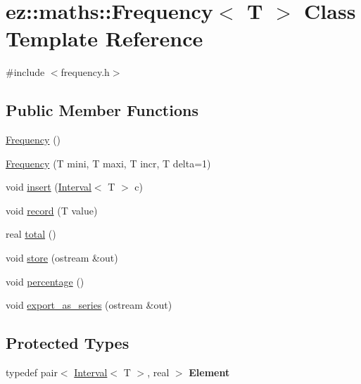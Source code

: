 \hypertarget{classez_1_1maths_1_1Frequency}{}\section{ez\+:\+:maths\+:\+:Frequency$<$ T $>$ Class Template Reference}
\label{classez_1_1maths_1_1Frequency}


{\ttfamily \#include $<$frequency.\+h$>$}

\subsection*{Public Member Functions}
\begin{DoxyCompactItemize}
\item 
\hyperlink{classez_1_1maths_1_1Frequency_aa090ee7e4117d4f5a694de71c44ec789}{Frequency} ()
\item 
\hyperlink{classez_1_1maths_1_1Frequency_a5fe6cf61394f7fc424c4d93392f734a2}{Frequency} (T mini, T maxi, T incr, T delta=1)
\item 
void \hyperlink{classez_1_1maths_1_1Frequency_a93882872b801cb8f47e61f32b24a051a}{insert} (\hyperlink{classez_1_1maths_1_1Interval}{Interval}$<$ T $>$ c)
\item 
void \hyperlink{classez_1_1maths_1_1Frequency_acd474d72e33becac99dc5dff9bcdb3e8}{record} (T value)
\item 
real \hyperlink{classez_1_1maths_1_1Frequency_aa18480ae307a14ad3a528476194d022e}{total} ()
\item 
void \hyperlink{classez_1_1maths_1_1Frequency_a102cd5f7b102ee433126fe809b2dfccb}{store} (ostream \&out)
\item 
void \hyperlink{classez_1_1maths_1_1Frequency_a4b1bc9f927a526e0ca1bbc59f1a14ca6}{percentage} ()
\item 
void \hyperlink{classez_1_1maths_1_1Frequency_af24be0f62175280c79ef1107f4a07b8d}{export\+\_\+as\+\_\+series} (ostream \&out)
\end{DoxyCompactItemize}
\subsection*{Protected Types}
\begin{DoxyCompactItemize}
\item 
\mbox{\label{classez_1_1maths_1_1Frequency_aa22594e9d41c897c4aec8c8527046e17}} 
typedef pair$<$ \hyperlink{classez_1_1maths_1_1Interval}{Interval}$<$ T $>$, real $>$ {\bfseries Element}
\end{DoxyCompactItemize}
